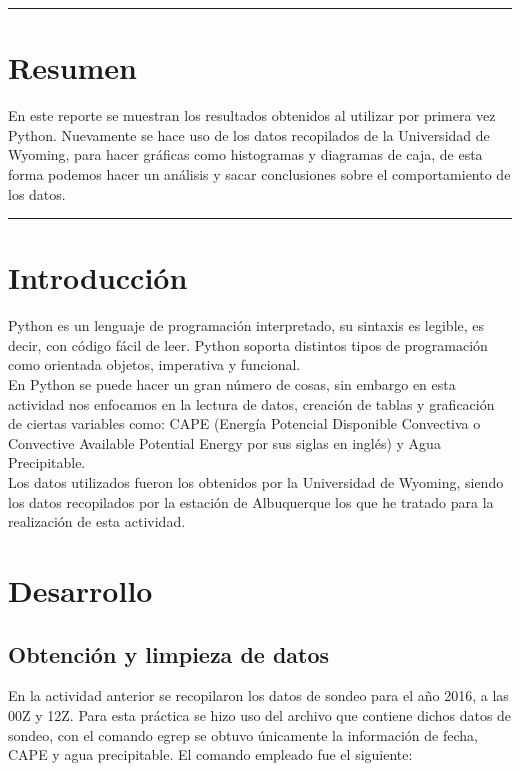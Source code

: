 \documentclass[12pt]{article}
\begin{document}
\begin{doublespace}

\hrule
\section*{Resumen}
En este reporte se muestran los resultados obtenidos al utilizar por primera vez Python. Nuevamente se hace uso de los datos recopilados de la Universidad de Wyoming, para hacer gráficas como histogramas y diagramas de caja, de esta forma podemos hacer un análisis y sacar conclusiones sobre el comportamiento de los datos.

\vspace{0.6 cm}
\hrule

\vspace{0.6 cm}

\section{Introducción}
Python es un lenguaje de programación interpretado, su sintaxis es legible, es decir, con código fácil de leer. Python soporta distintos tipos de programación como orientada objetos, imperativa y funcional.
\\

En Python se puede hacer un gran número de cosas, sin embargo en esta actividad nos enfocamos en la lectura de datos, creación de tablas y graficación de ciertas variables como: CAPE (Energía Potencial Disponible Convectiva o Convective Available Potential Energy por sus siglas en inglés) y Agua Precipitable. 
\\

Los datos utilizados fueron los obtenidos por la Universidad de Wyoming, siendo los datos recopilados por la estación de Albuquerque los que he tratado para la realización de esta actividad. 

\section{Desarrollo}
\subsection{Obtención y limpieza de datos}
En la actividad anterior se recopilaron los datos de sondeo para el año 2016, a las 00Z y 12Z. Para esta práctica se hizo uso del archivo que contiene dichos datos de sondeo, con el comando egrep se obtuvo únicamente la información de fecha, CAPE y agua precipitable. El comando empleado fue el siguiente:


\end{doublespace}
\end{document}
